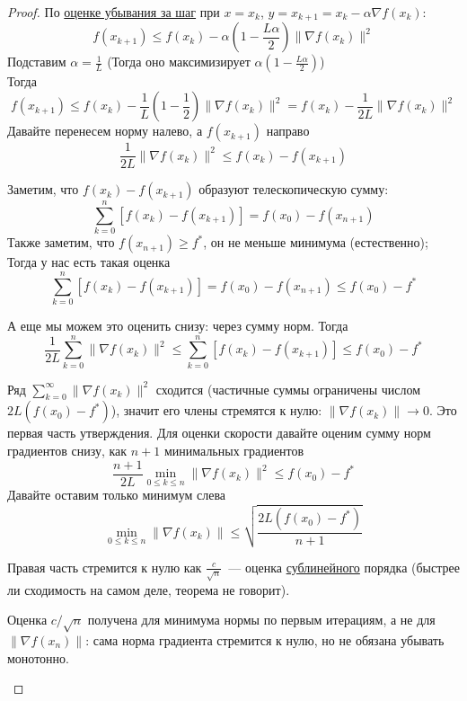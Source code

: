 \begin{proof}
  По \hyperref[note:FFEA1F1D-B70C-4B4A-9386-8344A2A3BBC4]{оценке убывания за шаг} при $x = x_k$, $y = x_{k+1} = x_k - \alpha \nabla f(x_k)$:
  \[
  f(x_{k+1}) \le f(x_k) - \alpha \left( 1 - \frac{L\alpha}{2} \right) \|\nabla f(x_k)\|^2
  \]
  Подставим $\alpha = \frac{1}{L}$ (Тогда оно максимизирует $\alpha \left(1- \frac{L \alpha}{2}\right)$) \\
  Тогда
  \[
  f(x_{k+1}) \le f(x_k) - \frac{1}{L} \left( 1 - \frac{1}{2}  \right) \|\nabla f(x_k)\|^2 = f(x_k) - \frac{1}{2L} \| \nabla f(x_k)\|^2
  \]
  Давайте перенесем норму налево, а $f(x_{k+1})$ направо
  \[
  \frac{1}{2L} \|\nabla f(x_k)\|^2 \le f(x_k) - f(x_{k+1})
  \]

  Заметим, что $f(x_k) - f(x_{k+1})$ образуют телескопическую сумму:
  \[
  \sum\limits_{k=0}^n [f(x_k) - f(x_{k+1})] = f(x_0) - f(x_{n+1})
  \]
  Также заметим, что $f(x_{n+1}) \ge f^{*}$, он не меньше минимума (естественно); Тогда у нас есть такая оценка
  \[
  \sum\limits_{k=0}^n [f(x_k) - f(x_{k+1})] = f(x_0) - f(x_{n+1}) \le f(x_0) - f^{*}
  \]

  А еще мы можем это оценить снизу: через сумму норм. Тогда
  \[
  \frac{1}{2L} \sum\limits_{k=0}^n \|\nabla f(x_k)\|^2 \le \sum\limits_{k=0}^n [f(x_k) - f(x_{k+1})] \le f(x_0) - f^{*}
  \]

  Ряд $\sum\limits_{k=0}^{\infty} \|\nabla f(x_k)\|^2$ сходится (частичные суммы ограничены числом $2L(f(x_0) - f^{*})$), значит его члены стремятся к нулю: $\|\nabla f(x_k)\| \to 0$. Это первая часть утверждения. Для оценки скорости
  давайте оценим сумму норм градиентов снизу, как $n+1$ минимальных градиентов
  \[
  \frac{n+1}{2L} \min_{0 \le k \le n} \| \nabla f(x_k)\|^2 \le f(x_0) -f^{*}
  \]
  Давайте оставим только минимум слева
  \[
  \min_{0 \le k \le n} \|\nabla f(x_k)\| \le \sqrt{\frac{2L (f(x_0) - f^{*})}{n+1}}
  \]

  Правая часть стремится к нулю как $\frac{c}{\sqrt{n}}$~--- оценка \hyperref[note:A74C35E2-DDF7-4115-99B7-2448CF7C6878]{сублинейного} порядка (быстрее ли сходимость на самом деле, теорема не говорит).

  \begin{remark}
    Оценка $c/\sqrt{n}$ получена для минимума нормы по первым итерациям, а не для $\|\nabla f(x_n)\|$: сама норма градиента стремится к нулю, но не обязана убывать монотонно.
  \end{remark}
\end{proof}
